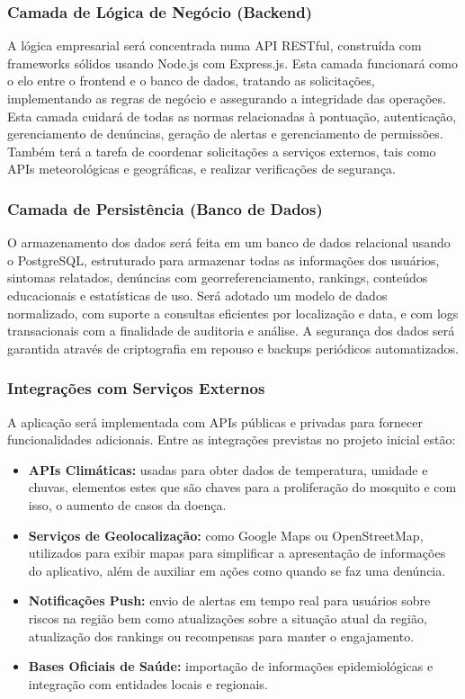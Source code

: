 \documentclass[a5paper, 12pt]{article}
\begin{document}
\subsubsection{Camada de Lógica de Negócio (Backend)}

A lógica empresarial será concentrada numa API RESTful, construída com frameworks sólidos usando Node.js com Express.js. Esta camada funcionará como o elo entre o frontend e o banco de dados, tratando as solicitações, implementando as regras de negócio e assegurando a integridade das operações.
Esta camada cuidará de todas as normas relacionadas à pontuação, autenticação, gerenciamento de denúncias, geração de alertas e gerenciamento de permissões.  Também terá a tarefa de coordenar solicitações a serviços externos, tais como APIs meteorológicas e geográficas, e realizar verificações de segurança.

\subsubsection{Camada de Persistência (Banco de Dados)}

O armazenamento dos dados será feita em um banco de dados relacional usando o  PostgreSQL, estruturado para armazenar todas as informações dos usuários, sintomas relatados, denúncias com georreferenciamento, rankings, conteúdos educacionais e estatísticas de uso.
Será adotado um modelo de dados normalizado, com suporte a consultas eficientes por localização e data, e com logs transacionais com a finalidade de auditoria e análise. A segurança dos dados será garantida através de criptografia em repouso e backups periódicos automatizados.

\subsubsection{Integrações com Serviços Externos}

A aplicação será implementada com APIs públicas e privadas para fornecer funcionalidades adicionais. Entre as integrações previstas no projeto inicial estão:

\begin{itemize}
    \item \textbf{APIs Climáticas:} usadas para obter dados de temperatura, umidade e chuvas, elementos estes que são chaves para a proliferação do mosquito e com isso, o aumento de casos da doença.
    \item \textbf{Serviços de Geolocalização:} como Google Maps ou OpenStreetMap, utilizados para exibir mapas para simplificar a apresentação de informações do aplicativo, além de auxiliar em ações como quando se faz uma denúncia.
    \item \textbf{Notificações Push:} envio de alertas em tempo real para usuários sobre riscos na região bem como atualizações sobre a situação atual da região, atualização dos rankings ou recompensas para manter o engajamento.
    \item \textbf{Bases Oficiais de Saúde:} importação de informações epidemiológicas e integração com entidades locais e regionais.
\end{itemize}
\end{document}
